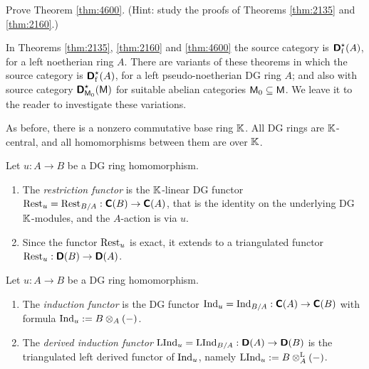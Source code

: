 \begin{exer} \label{exer:4600}
Prove Theorem \ref{thm:4600}.  (Hint: study the proofs of Theorems 
\ref{thm:2135} and \ref{thm:2160}.)
\end{exer}

\begin{rem} \label{rem:4600}
In Theorems \ref{thm:2135}, \ref{thm:2160} and \ref{thm:4600} the 
source category is $\boldsymbol{\mathsf{D}}^{\star}_{\mathrm{f}}(A)$, for a left noetherian 
ring $A$. There are variants of these theorems in which the source category
is $\boldsymbol{\mathsf{D}}^{\star}_{\mathrm{f}}(A)$, for a left pseudo-noetherian DG 
ring $A$; and also with source category 
$\boldsymbol{\mathsf{D}}^{\star}_{\operatorname{\mathsf{M}}_0}(\operatorname{\mathsf{M}})$
for suitable abelian categories $\operatorname{\mathsf{M}}_0 \subseteq \operatorname{\mathsf{M}}$. 
We leave it to the reader to investigate these variations. 
\end{rem}




\label{subsec:adjs-NC}

As before, there is a nonzero commutative base ring $\mathbb{K}$. All DG rings are 
$\mathbb{K}$-central, and all homomorphisms between them are over $\mathbb{K}$.

\begin{dfn} \label{dfn:3086}
Let $u : A \to B$ be a DG ring homomorphism.
\begin{enumerate}
\item The {\em restriction functor}%
is the $\mathbb{K}$-linear DG functor%
$\operatorname{Rest}_u = \operatorname{Rest}_{B / A} : \boldsymbol{\mathsf{C}}(B) \to \boldsymbol{\mathsf{C}}(A)$,
that is the identity on the underlying DG 
$\mathbb{K}$-modules, and the $A$-action is via $u$.

\item Since the functor $\operatorname{Rest}_u$  is exact, it extends to a 
triangulated functor 
$\operatorname{Rest}_u : \boldsymbol{\mathsf{D}}(B) \to \boldsymbol{\mathsf{D}}(A)$.
\end{enumerate}
\end{dfn}

\begin{dfn} \label{dfn:3087}
Let $u : A \to B$ be a DG ring homomorphism.
\begin{enumerate}
\item The {\em induction functor}%
%
is the DG functor 
$\operatorname{Ind}_u  = \operatorname{Ind}_{B / A} : \boldsymbol{\mathsf{C}}(A) \to \boldsymbol{\mathsf{C}}(B)$
with formula $\operatorname{Ind}_u := B \otimes_A (-)$.

\item The {\em derived induction functor}%
%
$\operatorname{LInd}_u  = \operatorname{LInd}_{B / A} : \boldsymbol{\mathsf{D}}(A) \to \boldsymbol{\mathsf{D}}(B)$ 
is the triangulated left derived functor of $\operatorname{Ind}_u$, namely 
$\operatorname{LInd}_u := B \otimes^{\mathrm{L}}_A (-)$.
\end{enumerate}
\end{dfn}

